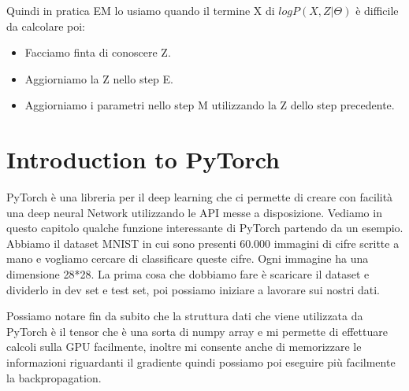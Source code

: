 \documentclass[14pt]{extreport}
\begin{document}
Quindi in pratica EM lo usiamo quando il termine X di $log P(X, Z | \Theta)$ è difficile da calcolare poi:
\begin{itemize}
	\item Facciamo finta di conoscere Z.
	\item Aggiorniamo la Z nello step E.
	\item Aggiorniamo i parametri nello step M utilizzando la Z dello step precedente.
\end{itemize}











































\chapter{Introduction to PyTorch}

PyTorch è una libreria per il deep learning che ci permette di creare con facilità una deep neural Network utilizzando le API messe a disposizione.
Vediamo in questo capitolo qualche funzione interessante di PyTorch partendo da un esempio. Abbiamo il dataset MNIST in cui sono presenti 60.000
immagini di cifre scritte a mano e vogliamo cercare di classificare queste cifre. Ogni immagine ha una dimensione 28*28. La prima cosa che dobbiamo
fare è scaricare il dataset e dividerlo in dev set e test set, poi possiamo iniziare a lavorare sui nostri dati.

Possiamo notare fin da subito che la struttura dati che viene utilizzata da PyTorch è il tensor che è una sorta di numpy array e mi permette di
effettuare calcoli sulla GPU facilmente, inoltre mi consente anche di memorizzare le informazioni riguardanti il gradiente quindi possiamo poi
eseguire più facilmente la backpropagation.
\end{document}
